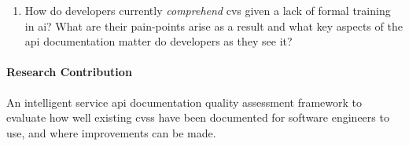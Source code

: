 \begin{titled-frame}
\begin{enumerate}[label=\textbf{RQ1.\arabic*.}, ref=RQ1.\arabic*, leftmargin=3.5\parindent, rightmargin=1\parindent]
  \item How do developers currently \textit{comprehend} \gls{cvs} given a lack of formal training in \gls{ai}? What are their pain-points arise as a result and what key aspects of the \gls{api} documentation matter do developers as they see it? %
  \label{rqs:apidoc:how-do-devs-understand-it}
\end{enumerate}

\paragraph{Research Contribution} An intelligent service \gls{api} documentation quality assessment framework to evaluate how well existing \glspl{cvs} have been documented for software engineers to use, and where improvements can be made.
\ifdefined\review\else\end{titled-frame}\fi

